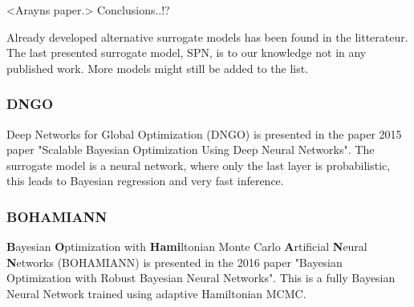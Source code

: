 <Arayns paper.>
Conclusions..!?

Already developed alternative surrogate models has been found in the litterateur. The last presented
surrogate model, SPN, is to our knowledge not in any published work. More models might still be
added to the list. 

\subsubsection*{DNGO}
Deep Networks for Global Optimization (DNGO) is presented in the paper 2015 paper "Scalable Bayesian
Optimization Using Deep Neural Networks"\cite{snoek2015scalable}. The surrogate model is a neural
network, where only the last layer is probabilistic, this leads to Bayesian regression and very fast
inference.  

\subsubsection*{BOHAMIANN}
\textbf{B}ayesian \textbf{O}ptimization with \textbf{Hami}ltonian Monte Carlo \textbf{A}rtificial
\textbf{N}eural \textbf{N}etworks (BOHAMIANN) is presented in the 2016 paper "Bayesian Optimization
with Robust Bayesian Neural Networks"\cite{NIPS2016_a96d3afe}. This is a fully Bayesian Neural
Network trained using adaptive Hamiltonian MCMC. 